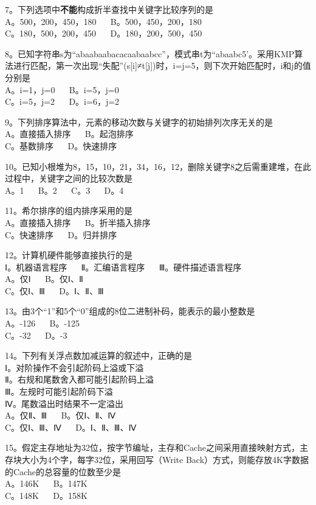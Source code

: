 7。下列选项中\textbf{不能}构成折半查找中关键字比较序列的是 \\
A。500，200，450，180 $\quad$ B。500，450，200，180 \\
C。180，500，200，450 $\quad$ D。180，200，500，450

8。已知字符串s为“abaabaabacacaabaabcc”，模式串t为“abaabc5’。采用KMP算法进行匹配，第一次出现“失配”(s[i]≠t[j])时，i=j=5，则下次开始匹配时，i和j的值分别是 \\
A。i=1，j=0 $\quad$ B。i=5，j=0 \\
C。i=5，j=2 $\quad$ D。i=6，j=2

9。下列排序算法中，元素的移动次数与关键字的初始排列次序无关的是 \\
A。直接插入排序 $\quad$ B。起泡排序 \\
C。基数排序 $\quad$ D。快速排序

10。已知小根堆为8，15，10，21，34，16，12，删除关键字8之后需重建堆，在此过程中，关键字之间的比较次数是 \\
A。1 $\quad$ B。2 $\quad$ C。3 $\quad$ D。4

11。希尔排序的组内排序采用的是 \\
A。直接插入排序 $\quad$ B。折半插入排序 \\
C。快速排序 $\quad$ D。归并排序

12。计算机硬件能够直接执行的是 \\
Ⅰ。机器语言程序 $\quad$ Ⅱ。汇编语言程序 $\quad$ Ⅲ。硬件描述语言程序 \\
A。仅Ⅰ $\quad$ B。仅Ⅰ、Ⅱ \\
C。仅Ⅰ、Ⅲ $\quad$ D。Ⅰ、Ⅱ、Ⅲ

13。由3个“1”和5个“0”组成的8位二进制补码，能表示的最小整数是 \\
A。-126 $\quad$ B。-125 \\
C。-32 $\quad$ D。-3

14。下列有关浮点数加减运算的叙述中，正确的是 \\
Ⅰ。对阶操作不会引起阶码上溢或下溢 \\
Ⅱ。右规和尾数舍入都可能引起阶码上溢 \\
Ⅲ。左规时可能引起阶码下溢 \\
Ⅳ。尾数溢出时结果不一定溢出 \\
A。仅Ⅱ、Ⅲ $\quad$ B。仅Ⅰ、Ⅱ、Ⅳ \\
C。仅Ⅰ、Ⅲ、Ⅳ $\quad$ D。Ⅰ、Ⅱ、Ⅲ、Ⅳ

15。假定主存地址为32位，按字节编址，主存和Cache之间采用直接映射方式，主存块大小为4个字，每字32位，采用回写（Write Back）方式，则能存放4K字数据的Cache的总容量的位数至少是 \\
A。146K $\quad$ B。147K \\
C。148K $\quad$ D。158K

